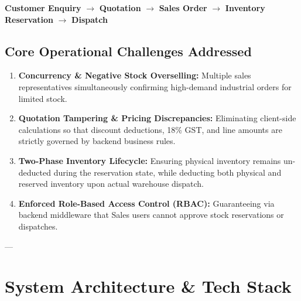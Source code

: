 \documentclass[11pt,a4paper]{article}
\begin{document}
\begin{center}
\begin{tcolorbox}[colback=lightgray,colframe=primary,arc=2mm,width=0.95\textwidth]
\centering
\textbf{Customer Enquiry} $\longrightarrow$ \textbf{Quotation} $\longrightarrow$ \textbf{Sales Order} $\longrightarrow$ \textbf{Inventory Reservation} $\longrightarrow$ \textbf{Dispatch}
\end{tcolorbox}
\end{center}

\subsection{Core Operational Challenges Addressed}
\begin{enumerate}[itemsep=0.3em]
    \item \textbf{Concurrency \& Negative Stock Overselling:} Multiple sales representatives simultaneously confirming high-demand industrial orders for limited stock.
    \item \textbf{Quotation Tampering \& Pricing Discrepancies:} Eliminating client-side calculations so that discount deductions, 18\% GST, and line amounts are strictly governed by backend business rules.
    \item \textbf{Two-Phase Inventory Lifecycle:} Ensuring physical inventory remains un-deducted during the reservation state, while deducting both physical and reserved inventory upon actual warehouse dispatch.
    \item \textbf{Enforced Role-Based Access Control (RBAC):} Guaranteeing via backend middleware that Sales users cannot approve stock reservations or dispatches.
\end{enumerate}

---

\section{System Architecture \& Tech Stack}
\end{document}
